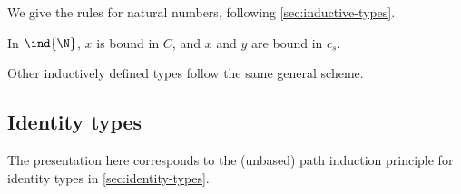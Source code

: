 %

We give the rules for natural numbers, following \cref{sec:inductive-types}.

%
In $\ind{\N}$, $x$ is bound in $C$, and $x$ and $y$ are bound in $c_s$.

Other inductively defined types follow the same general scheme.

%

\subsection{Identity types}

\label{sec:more-formal-identity}

%

The presentation here corresponds to the (unbased) path induction principle for identity types in
\cref{sec:identity-types}.

